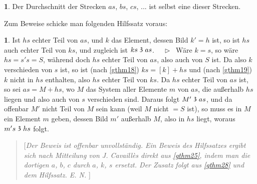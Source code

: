 \documentclass[leqno,hidelinks]{article}
\theoremstyle{definition}
\newtheorem*{zusatz}{\protect\zusatzname}
\newtheorem*{hilfssatz}{\protect\hilfssatzname}
\newcommand{\zusatzname}{}
\newcommand{\hilfssatzname}{}
\renewcommand{\zusatzname}{Zusatz}%
\renewcommand{\hilfssatzname}{Hilfssatz}%
\renewcommand{\zusatzname}{Corollary}%
\renewcommand{\hilfssatzname}{Lemma}%
\newcommand\Beweis{\medskip \newline $ \phantom{'.'} \rhd \ $}%
\newcommand\TeilVon{\mathrel{\raisebox{0.45ex}{$\mathfrak{3}$}}}
\newcommand{\sref}[1]{\underline{\ref{#1}}}%
\begin{document}
\begin{paracol}{2}
\begin{zusatz}\label{zusatz3}
Der Durchschnitt der Strecken $as$, $bs$, $cs$, ... ist selbst eine dieser Strecken.
\end{zusatz}

Zum Beweise schicke man folgenden Hilfssatz voraus:

\begin{hilfssatz}\label{hilfssatz1}
Ist $hs$ echter Teil von $as$, und $k$ das Element, dessen Bild $k' = h$ ist,
so ist $hs$ auch echter Teil von $ks$, und zugleich ist $ks \TeilVon as$.
\Beweis
Wäre $k = s$, so wäre $hs = s's = S$, während doch $hs$ echter Teil von $as$,
also auch von $S$ ist. Da also $k$ verschieden von $s$ ist, so ist (nach \sref{gthm18})
$ks = [k] + hs$ und (nach \sref{gthm19}) $k$ nicht in $hs$ enthalten, also $hs$
echter Teil von $ks$. Da $hs$ echter Teil von $as$ ist, so sei $as = M + hs$,
wo $M$ das System aller Elemente $m$ von $as$, die außerhalb $hs$ liegen und
also auch von $s$ verschieden sind. Daraus folgt $M' \TeilVon as$, und da
offenbar $M'$ nicht Teil von $M$ sein kann (weil $M$ nicht $= S$ ist), so
muss es in $M$ ein Element $m$ geben, dessen Bild $m'$ außerhalb $M$, also
in $hs$ liegt, woraus $m's \TeilVon hs$ folgt.
\end{hilfssatz}

\begin{quote}
[\emph{Der Beweis ist offenbar unvollständig. Ein Beweis des Hilfssatzes ergibt
sich nach Mitteilung von J. Cavaillès direkt aus \sref{gthm25}, indem man die
dortigen $a$, $b$, $c$ durch $a$, $k$, $s$ ersetzt.
Der Zusatz folgt aus \sref{gthm28} und dem Hilfssatz. E. N.
}] \end{quote}


\end{paracol}
\end{document}
